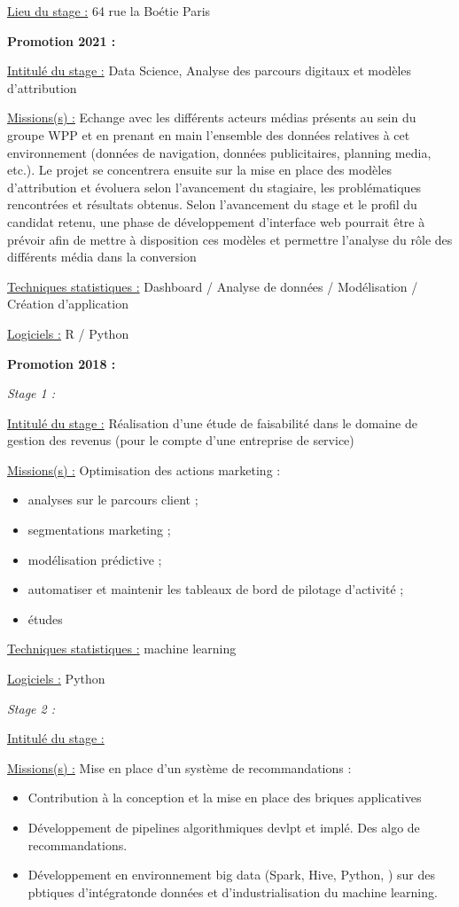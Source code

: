 \documentclass[
  letterpaper,
  DIV=11,
  numbers=noendperiod]{scrreprt}
\begin{document}
\uline{Lieu du stage :} 64 rue la Boétie Paris

\textbf{Promotion 2021 :}

\uline{Intitulé du stage :} Data Science, Analyse des parcours digitaux
et modèles d'attribution

\uline{Missions(s) :} Echange avec les différents acteurs médias
présents au sein du groupe WPP et en prenant en main l'ensemble des
données relatives à cet environnement (données de navigation, données
publicitaires, planning media, etc.). Le projet se concentrera ensuite
sur la mise en place des modèles d'attribution et évoluera selon
l'avancement du stagiaire, les problématiques rencontrées et résultats
obtenus. Selon l'avancement du stage et le profil du candidat retenu,
une phase de développement d'interface web pourrait être à prévoir afin
de mettre à disposition ces modèles et permettre l'analyse du rôle des
différents média dans la conversion

\uline{Techniques statistiques :} Dashboard / Analyse de données /
Modélisation / Création d'application

\uline{Logiciels :} R / Python

\textbf{Promotion 2018 :}

\emph{Stage 1 :}

\uline{Intitulé du stage :} Réalisation d'une étude de faisabilité dans
le domaine de gestion des revenus (pour le compte d'une entreprise de
service)

\uline{Missions(s) :} Optimisation des actions marketing :

\begin{itemize}
\item
  analyses sur le parcours client ;
\item
  segmentations marketing ;
\item
  modélisation prédictive ;
\item
  automatiser et maintenir les tableaux de bord de pilotage d'activité ;
\item
  études
\end{itemize}

\uline{Techniques statistiques :} machine learning

\uline{Logiciels :} Python

\emph{Stage 2 :}

\uline{Intitulé du stage :}

\uline{Missions(s) :} Mise en place d'un système de recommandations :

\begin{itemize}
\item
  Contribution à la conception et la mise en place des briques
  applicatives
\item
  Développement de pipelines algorithmiques devlpt et implé. Des algo de
  recommandations.
\item
  Développement en environnement big data (Spark, Hive, Python, ) sur
  des pbtiques d'intégratonde données et d'industrialisation du machine
  learning.
\end{itemize}
\end{document}
